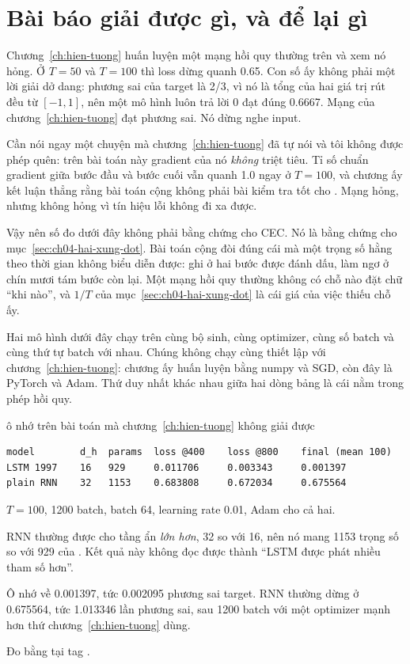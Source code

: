 \section{Bài báo giải được gì, và để lại gì}
\label{sec:ch04-con-lai-gi}

%
Chương~\ref{ch:hien-tuong} huấn luyện một mạng hồi quy thường trên
 và xem nó hỏng. Ở \(T = 50\) và \(T = 100\)
thì loss dừng quanh 0.65. Con số ấy không phải một lời giải dở dang: phương sai
của target là 2/3, vì nó là tổng của hai giá trị rút đều từ \([-1, 1]\), nên
một mô hình luôn trả lời 0 đạt đúng 0.6667. Mạng của
chương~\ref{ch:hien-tuong} đạt phương sai. Nó dừng nghe input.

Cần nói ngay một chuyện mà chương~\ref{ch:hien-tuong} đã tự nói và tôi không
được phép quên: trên bài toán này gradient của nó \emph{không} triệt tiêu. Tỉ
số chuẩn gradient giữa bước đầu và bước cuối vẫn quanh 1.0 ngay ở \(T = 100\),
và chương ấy kết luận thẳng rằng bài toán cộng không phải bài kiểm tra tốt cho
. Mạng hỏng, nhưng không hỏng vì
tín hiệu lỗi không đi xa được.

Vậy nên số đo dưới đây không phải bằng chứng cho CEC. Nó là bằng chứng cho
mục~\ref{sec:ch04-hai-xung-dot}. Bài toán cộng đòi đúng cái mà một trọng số
hằng theo thời gian không biểu diễn được: ghi ở hai bước được đánh dấu, làm ngơ
ở chín mươi tám bước còn lại. Một mạng hồi quy thường không có chỗ nào đặt chữ
\enquote{khi nào}, và \(1/T\) của mục~\ref{sec:ch04-hai-xung-dot} là cái giá
của việc thiếu chỗ ấy.

Hai mô hình dưới đây chạy trên cùng bộ sinh, cùng optimizer, cùng số batch và
cùng thứ tự batch với nhau. Chúng không chạy cùng thiết lập với
chương~\ref{ch:hien-tuong}: chương ấy huấn luyện bằng numpy và SGD, còn đây là
PyTorch và Adam. Thứ duy nhất khác nhau giữa hai dòng bảng là cái nằm trong
phép hồi quy.

\begin{measured}{ô nhớ trên bài toán mà chương~\ref{ch:hien-tuong} không giải được}
\begin{verbatim}
model        d_h  params  loss @400    loss @800    final (mean 100)
LSTM 1997    16   929     0.011706     0.003343     0.001397
plain RNN    32   1153    0.683808     0.672034     0.675564
\end{verbatim}

\(T = 100\), 1200 batch, batch 64, learning rate 0.01, Adam cho cả hai.

RNN thường được cho tầng ẩn \emph{lớn hơn}, 32 so với 16, nên nó mang 1153
trọng số so với 929 của . Kết quả này không đọc được
thành \enquote{LSTM được phát nhiều tham số hơn}.

Ô nhớ về 0.001397, tức 0.002095 phương sai target. RNN thường dừng ở 0.675564,
tức 1.013346 lần phương sai, sau 1200 batch với một optimizer mạnh hơn thứ
chương~\ref{ch:hien-tuong} dùng.

Đo bằng  tại tag .
\end{measured}

